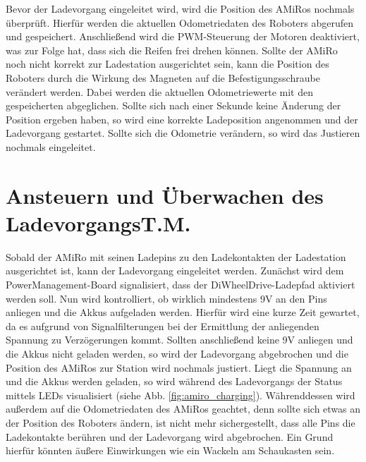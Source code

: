 Bevor der Ladevorgang eingeleitet wird, wird die Position des AMiRos nochmals überprüft. Hierfür werden die aktuellen Odometriedaten des Roboters abgerufen und gespeichert. Anschließend wird die PWM-Steuerung der Motoren deaktiviert, was zur Folge hat, dass sich die Reifen frei drehen können. Sollte der AMiRo noch nicht korrekt zur Ladestation ausgerichtet sein, kann die Position des Roboters durch die Wirkung des Magneten auf die Befestigungsschraube verändert werden. Dabei werden die aktuellen Odometriewerte mit den gespeicherten abgeglichen. Sollte sich nach einer Sekunde keine Änderung der Position ergeben haben, so wird eine korrekte Ladeposition angenommen und der Ladevorgang gestartet. Sollte sich die Odometrie verändern, so wird das Justieren nochmals eingeleitet. 





\section[Ansteuern und Überwachen des Ladevorgangs]{Ansteuern und Überwachen des Ladevorgangs\hfill {\normalsize T.M.}}\label{kap:ladevorgang} %

Sobald der AMiRo mit seinen Ladepins zu den Ladekontakten der Ladestation ausgerichtet ist, kann der Ladevorgang eingeleitet werden.
Zunächst wird dem PowerManagement-Board signalisiert, dass der DiWheelDrive-Ladepfad aktiviert werden soll. Nun wird kontrolliert, ob wirklich mindestens 9V an den Pins anliegen und die Akkus aufgeladen werden. Hierfür wird eine kurze Zeit gewartet, da es aufgrund von Signalfilterungen bei der Ermittlung der anliegenden Spannung zu Verzögerungen kommt. Sollten anschließend keine 9V anliegen und die Akkus nicht geladen werden, so wird der Ladevorgang abgebrochen und die Position des AMiRos zur Station wird nochmals justiert.
Liegt die Spannung an und die Akkus werden geladen, so wird während des Ladevorgangs der Status mittels LEDs visualisiert (siehe Abb. \ref{fig:amiro_charging}). 
Währenddessen wird außerdem auf die Odometriedaten des AMiRos geachtet, denn sollte sich etwas an der Position des Roboters ändern, ist nicht mehr sichergestellt, dass alle Pins die Ladekontakte berühren und der Ladevorgang wird abgebrochen. Ein Grund hierfür könnten äußere Einwirkungen wie ein Wackeln am Schaukasten sein.

